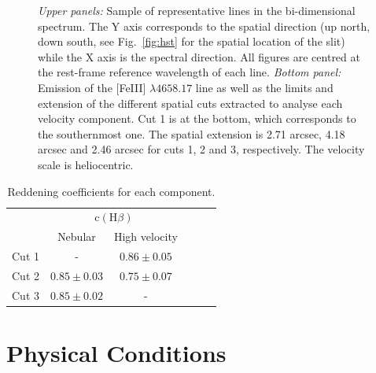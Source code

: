 \documentclass[fleqn,usenatbib]{mnras}
\begin{document}
\begin{figure}
\caption{\textit{Upper panels:} Sample of representative lines in the bi-dimensional spectrum. The Y axis corresponds to the spatial direction (up north, down south, see Fig.~\ref{fig:hst} for the spatial location of the slit) while the X axis is the spectral direction. All figures are centred at the rest-frame reference wavelength of each line. \textit{Bottom panel:} Emission of the [Fe\thinspace III] $\lambda 4658.17$ line as well as the limits and extension of the different spatial cuts extracted to analyse each velocity component. Cut 1 is at the bottom, which corresponds to the southernmost one. The spatial extension is 2.71 arcsec, 4.18 arcsec and 2.46 arcsec for cuts 1, 2 and 3, respectively. The velocity scale is heliocentric.}
\label{fig:cuts}
\end{figure}




\begin{table}
\caption{Reddening coefficients for each component.}
\label{tab:c_extin}
\begin{tabular}{lccccc}
\hline
 & \multicolumn{2}{c}{$\text{c}(\text{H}\beta)$} \\
  & Nebular & High velocity\\
\hline
Cut 1 & - & $0.86 \pm  0.05$  \\
Cut 2 & $0.85 \pm 0.03$ &$0.75 \pm 0.07$\\
Cut 3 & $0.85 \pm 0.02$&-\\
\hline
\end{tabular}
\end{table}





\section{Physical Conditions}
\label{sec:physical_cond}
\end{document}
